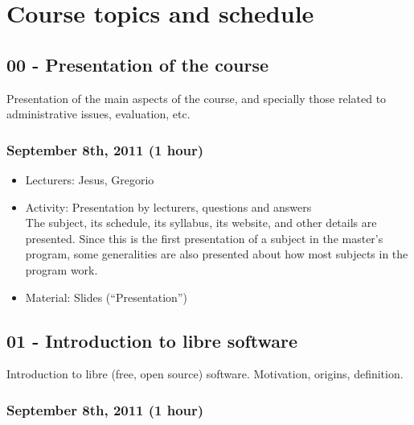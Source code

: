 \documentclass[a4paper]{article}
\begin{document}
\section{Course topics and schedule}

\subsection{00 - Presentation of the course}

Presentation of the main aspects of the course, and specially those related to administrative issues, evaluation, etc.

\subsubsection{September 8th, 2011 (1 hour)}

\begin{itemize}
\item Lecturers: Jesus, Gregorio
\item Activity: Presentation by lecturers, questions and answers \\
  The subject, its schedule, its syllabus, its website, and other details are presented. Since this is the first presentation of a subject in the master's program, some generalities are also presented about how most subjects in the program work.
\item Material: Slides (``Presentation'')
\end{itemize}

\subsection{01 - Introduction to libre software}

Introduction to libre (free, open source) software. Motivation, origins, definition.

\subsubsection{September 8th, 2011 (1 hour)}
\end{document}
